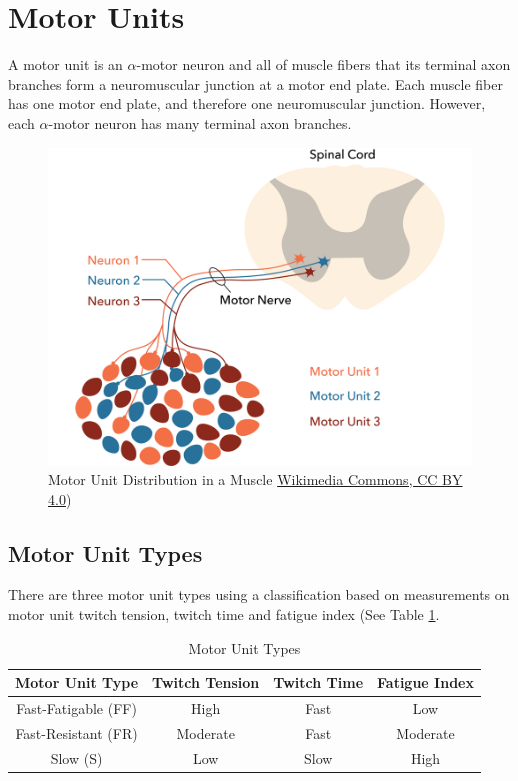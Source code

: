 \section{Motor Units}

A motor unit is an $\alpha$-motor neuron and all of muscle fibers that its terminal axon branches form a neuromuscular junction at a motor end plate. Each muscle fiber has one motor end plate, and therefore one neuromuscular junction. However, each $\alpha$-motor neuron has many terminal axon branches. 

\begin{figure}[!ht]
    \centering
    \includegraphics[width=1\linewidth]{./figure/motor_unit.png}
    \caption{Motor Unit Distribution in a Muscle \footnotesize{\href{https://commons.wikimedia.org/wiki/File:Motor_unit.png}{Wikimedia Commons, CC BY 4.0})}}
    \label{fig:motor_unit}
\end{figure}




\subsection{Motor Unit Types}

There are three motor unit types using a classification based on measurements on motor unit twitch tension, twitch time and fatigue index (See Table \ref{table:Motor_Unit_Types}.


\begin{table}[h!]
\centering
\begin{tabular}{||c c c c||} 
 \hline
 Motor Unit Type & Twitch Tension & Twitch Time & Fatigue Index \\ [0.5ex] 
 \hline\hline
 Fast-Fatigable (FF)  & High & Fast & Low \\ 
 Fast-Resistant (FR)  & Moderate & Fast & Moderate \\
 Slow (S) &  Low & Slow & High \\ [1ex] 
 \hline
\end{tabular}
\caption{Motor Unit Types}
\label{table:Motor_Unit_Types}
\end{table}


